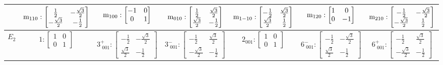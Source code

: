 \documentclass[fleqn,8pt,landscape]{jsarticle}
\begin{document}
\begin{longtable}{ccccccc}
& $ {\rm m}_{110}:\begin{bmatrix} \frac{1}{2} & - \frac{\sqrt{3}}{2} \\ - \frac{\sqrt{3}}{2} & - \frac{1}{2} \end{bmatrix} $ & $ {\rm m}_{100}:\begin{bmatrix} -1 & 0 \\ 0 & 1 \end{bmatrix} $ & $ {\rm m}_{010}:\begin{bmatrix} \frac{1}{2} & \frac{\sqrt{3}}{2} \\ \frac{\sqrt{3}}{2} & - \frac{1}{2} \end{bmatrix} $ & $ {\rm m}_{1-10}:\begin{bmatrix} - \frac{1}{2} & \frac{\sqrt{3}}{2} \\ \frac{\sqrt{3}}{2} & \frac{1}{2} \end{bmatrix} $ & $ {\rm m}_{120}:\begin{bmatrix} 1 & 0 \\ 0 & -1 \end{bmatrix} $ & $ {\rm m}_{210}:\begin{bmatrix} - \frac{1}{2} & - \frac{\sqrt{3}}{2} \\ - \frac{\sqrt{3}}{2} & \frac{1}{2} \end{bmatrix} $ \\ \hline
$ E_{2} $ & $ 1:\begin{bmatrix} 1 & 0 \\ 0 & 1 \end{bmatrix} $ & $ 3^{+}_{\,\,001}:\begin{bmatrix} - \frac{1}{2} & - \frac{\sqrt{3}}{2} \\ \frac{\sqrt{3}}{2} & - \frac{1}{2} \end{bmatrix} $ & $ 3^{-}_{\,\,001}:\begin{bmatrix} - \frac{1}{2} & \frac{\sqrt{3}}{2} \\ - \frac{\sqrt{3}}{2} & - \frac{1}{2} \end{bmatrix} $ & $ 2{}_{001}:\begin{bmatrix} 1 & 0 \\ 0 & 1 \end{bmatrix} $ & $ 6^{-}_{\,\,001}:\begin{bmatrix} - \frac{1}{2} & - \frac{\sqrt{3}}{2} \\ \frac{\sqrt{3}}{2} & - \frac{1}{2} \end{bmatrix} $ & $ 6^{+}_{\,\,001}:\begin{bmatrix} - \frac{1}{2} & \frac{\sqrt{3}}{2} \\ - \frac{\sqrt{3}}{2} & - \frac{1}{2} \end{bmatrix} $ \\

\end{longtable}
\end{document}
